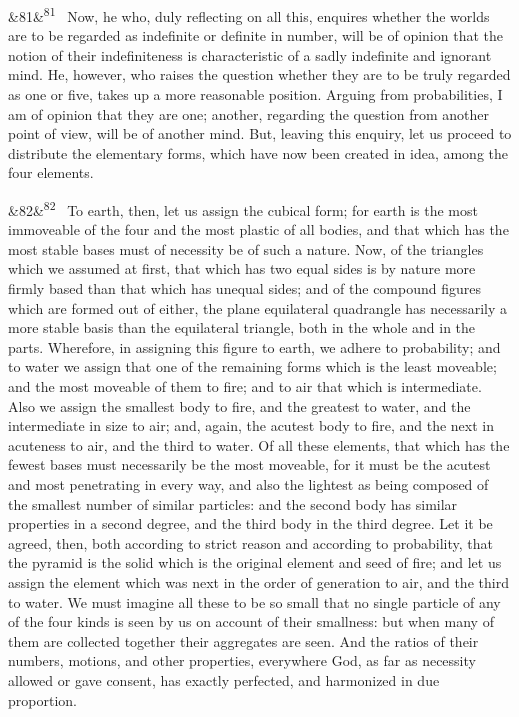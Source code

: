\documentclass[12pt]{article}
\newcommand{\para}[1][]{\par\noindent\ifx&#1&\else\textsuperscript{\footnotesize #1}~\fi}
\begin{document}
\para[81] Now, he who, duly reflecting on all this, enquires whether the worlds are to be regarded as indefinite or definite in number, will be of opinion that the notion of their indefiniteness is characteristic of a sadly indefinite and ignorant mind. He, however, who raises the question whether they are to be truly regarded as one or five, takes up a more reasonable position. Arguing from probabilities, I am of opinion that they are one; another, regarding the question from another point of view, will be of another mind. But, leaving this enquiry, let us proceed to distribute the elementary forms, which have now been created in idea, among the four elements.

\para[82] To earth, then, let us assign the cubical form; for earth is the most immoveable of the four and the most plastic of all bodies, and that which has the most stable bases must of necessity be of such a nature. Now, of the triangles which we assumed at first, that which has two equal sides is by nature more firmly based than that which has unequal sides; and of the compound figures which are formed out of either, the plane equilateral quadrangle has necessarily a more stable basis than the equilateral triangle, both in the whole and in the parts. Wherefore, in assigning this figure to earth, we adhere to probability; and to water we assign that one of the remaining forms which is the least moveable; and the most moveable of them to fire; and to air that which is intermediate. Also we assign the smallest body to fire, and the greatest to water, and the intermediate in size to air; and, again, the acutest body to fire, and the next in acuteness to air, and the third to water. Of all these elements, that which has the fewest bases must necessarily be the most moveable, for it must be the acutest and most penetrating in every way, and also the lightest as being composed of the smallest number of similar particles: and the second body has similar properties in a second degree, and the third body in the third degree. Let it be agreed, then, both according to strict reason and according to probability, that the pyramid is the solid which is the original element and seed of fire; and let us assign the element which was next in the order of generation to air, and the third to water. We must imagine all these to be so small that no single particle of any of the four kinds is seen by us on account of their smallness: but when many of them are collected together their aggregates are seen. And the ratios of their numbers, motions, and other properties, everywhere God, as far as necessity allowed or gave consent, has exactly perfected, and harmonized in due proportion.
\end{document}
